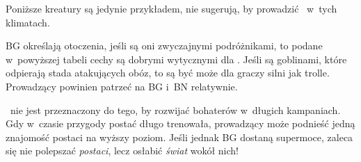 {	

	\noindent
	Poniższe kreatury są jedynie przykładem, nie sugerują, by prowadzić \nipajin\ w~tych klimatach.



	\noindent
	BG określają  otoczenia, jeśli są oni zwyczajnymi podróżnikami, to podane w~powyższej tabeli cechy są dobrymi wytycznymi dla . Jeśli są goblinami, które odpierają stada  atakujących obóz, to  są być może dla graczy silni jak trolle. Prowadzący powinien patrzeć na BG i~BN relatywnie.

	\nipajin\ nie jest przeznaczony do tego, by rozwijać bohaterów w~długich kampaniach. Gdy w~czasie przygody postać długo trenowała, prowadzący może podnieść jedną znajomość postaci na wyższy poziom. Jeśli jednak BG dostaną supermoce, zaleca się nie polepszać \emph{postaci}, lecz osłabić \emph{świat} wokół nich!
}
